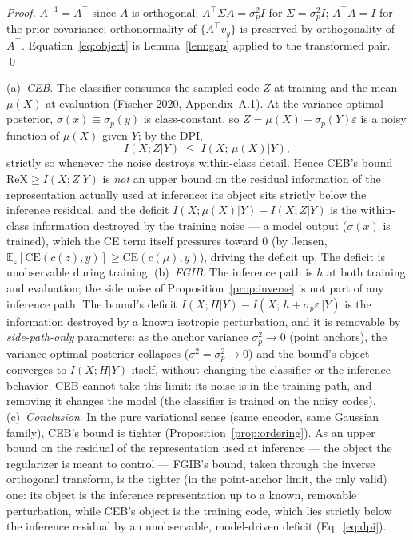 \begin{proof}
$A^{-1} = A^{\top}$ since $A$ is orthogonal; $A^{\top}\Sigma A = \sigma_p^2 I$ for
$\Sigma = \sigma_p^2 I$; $A^{\top}A = I$ for the prior covariance; orthonormality of
$\{A^{\top}v_y\}$ is preserved by orthogonality of $A^{\top}$. Equation~\eqref{eq:object}
is Lemma~\ref{lem:gap} applied to the transformed pair. \hfill\qed
\end{proof}

\begin{proposition}\label{prop:object}
(a)~\emph{CEB}. The classifier consumes the sampled code $Z$ at training and the mean
$\mu(X)$ at evaluation (Fischer 2020, Appendix~A.1). At the variance-optimal posterior,
$\sigma(x) \equiv \sigma_p(y)$ is class-constant, so $Z = \mu(X) + \sigma_p(Y)\varepsilon$
is a noisy function of $\mu(X)$ given $Y$; by the DPI,
\begin{equation}
I(X; Z | Y) \;\le\; I(X;\, \mu(X) | Y) ,
\label{eq:dpi}
\end{equation}
strictly so whenever the noise destroys within-class detail. Hence CEB's bound
$\mathrm{ReX} \ge I(X;Z|Y)$ is \emph{not} an upper bound on the residual information of
the representation actually used at inference: its object sits strictly below the
inference residual, and the deficit $I(X;\mu(X)|Y) - I(X;Z|Y)$ is the within-class
information destroyed by the training noise --- a model output ($\sigma(x)$ is trained),
which the CE term itself pressures toward $0$ (by Jensen,
$\mathbb{E}_z[\mathrm{CE}(c(z),y)] \ge \mathrm{CE}(c(\mu),y)$), driving the deficit up.
The deficit is unobservable during training.
(b)~\emph{FGIB}. The inference path is $h$ at both training and evaluation; the side
noise of Proposition~\ref{prop:inverse} is not part of any inference path. The bound's
deficit $I(X;H|Y) - I(X;\,h+\sigma_p\varepsilon\,|Y)$ is the information destroyed by a
known isotropic perturbation, and it is removable by \emph{side-path-only} parameters:
as the anchor variance $\sigma_p^2 \to 0$ (point anchors), the variance-optimal posterior
collapses ($\sigma^2 = \sigma_p^2 \to 0$) and the bound's object converges to
$I(X;H|Y)$ itself, without changing the classifier or the inference behavior.
CEB cannot take this limit: its noise is in the training path, and removing it changes
the model (the classifier is trained on the noisy codes).
(c)~\emph{Conclusion}. In the pure variational sense (same encoder, same Gaussian
family), CEB's bound is tighter (Proposition~\ref{prop:ordering}). As an upper bound on
the residual of the representation used at inference --- the object the regularizer is
meant to control --- FGIB's bound, taken through the inverse orthogonal transform, is the
tighter (in the point-anchor limit, the only valid) one: its object is the inference
representation up to a known, removable perturbation, while CEB's object is the training
code, which lies strictly below the inference residual by an unobservable, model-driven
deficit (Eq.~\eqref{eq:dpi}).
\end{proposition}

